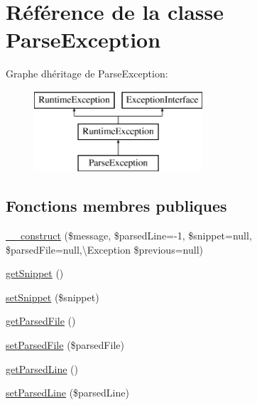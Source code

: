 \hypertarget{class_symfony_1_1_component_1_1_yaml_1_1_exception_1_1_parse_exception}{}\section{Référence de la classe Parse\+Exception}
\label{class_symfony_1_1_component_1_1_yaml_1_1_exception_1_1_parse_exception}
Graphe d\textquotesingle{}héritage de Parse\+Exception\+:\begin{figure}[H]
\begin{center}
\leavevmode
\includegraphics[height=3.000000cm]{class_symfony_1_1_component_1_1_yaml_1_1_exception_1_1_parse_exception}
\end{center}
\end{figure}
\subsection*{Fonctions membres publiques}
\begin{DoxyCompactItemize}
\item 
\hyperlink{class_symfony_1_1_component_1_1_yaml_1_1_exception_1_1_parse_exception_a99e0ee94b5004a79a158e36d89ae9525}{\+\_\+\+\_\+construct} (\$message, \$parsed\+Line=-\/1, \$snippet=null, \$parsed\+File=null,\textbackslash{}Exception \$previous=null)
\item 
\hyperlink{class_symfony_1_1_component_1_1_yaml_1_1_exception_1_1_parse_exception_a3577a5cda40bf567864069acc15de9aa}{get\+Snippet} ()
\item 
\hyperlink{class_symfony_1_1_component_1_1_yaml_1_1_exception_1_1_parse_exception_ad02c1878ebacd2bcc4cba29b30d34bdf}{set\+Snippet} (\$snippet)
\item 
\hyperlink{class_symfony_1_1_component_1_1_yaml_1_1_exception_1_1_parse_exception_a9b45ea03698aba0960d95b6cd650531f}{get\+Parsed\+File} ()
\item 
\hyperlink{class_symfony_1_1_component_1_1_yaml_1_1_exception_1_1_parse_exception_ab2218e0a8ed4623aa066bfc463e1ae15}{set\+Parsed\+File} (\$parsed\+File)
\item 
\hyperlink{class_symfony_1_1_component_1_1_yaml_1_1_exception_1_1_parse_exception_a9b38ce4f9248c08d644f4a09688e8ced}{get\+Parsed\+Line} ()
\item 
\hyperlink{class_symfony_1_1_component_1_1_yaml_1_1_exception_1_1_parse_exception_ab210c808bde567ec236e9532bd13b9e5}{set\+Parsed\+Line} (\$parsed\+Line)
\end{DoxyCompactItemize}


